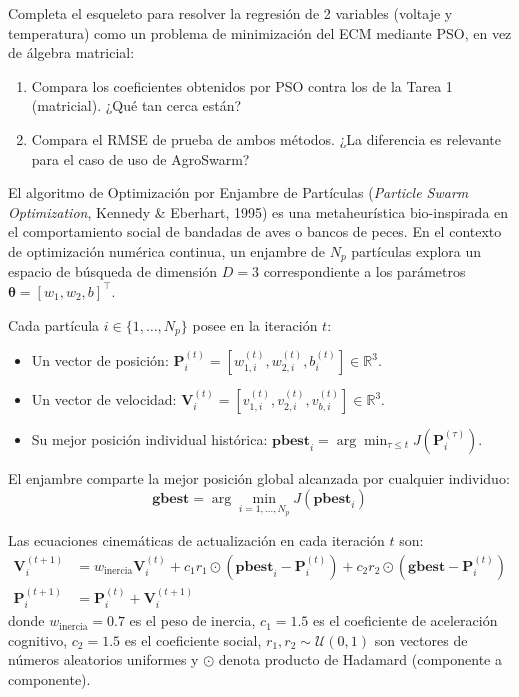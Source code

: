 \documentclass[12pt,a4paper]{article}
\newcommand{\titlefont}{\sffamily\bfseries}
\newcommand{\pthreeStep}[1]{%
  \par\vspace{10pt}%
  \noindent{\titlefont\fontsize{10.5}{12.5}\selectfont\bfseries\color{p3blue}\MakeUppercase{#1}}%
  \nopagebreak\par\vspace{3pt}\nopagebreak
}
\newcommand{\R}{\mathbb{R}}
\begin{document}
\begin{pthreeProblem}
Completa el esqueleto para resolver la regresión de 2 variables (voltaje y temperatura) como un problema de minimización del ECM mediante PSO, en vez de álgebra matricial:
\begin{enumerate}[label=(\alph*)]
  \item Compara los coeficientes obtenidos por PSO contra los de la Tarea 1 (matricial). ¿Qué tan cerca están?
  \item Compara el RMSE de prueba de ambos métodos. ¿La diferencia es relevante para el caso de uso de AgroSwarm?
\end{enumerate}
\end{pthreeProblem}

\pthreeStep{Paso 1: Fundamento Algorítmico de PSO}
El algoritmo de Optimización por Enjambre de Partículas (\textit{Particle Swarm Optimization}, Kennedy \& Eberhart, 1995) es una metaheurística bio-inspirada en el comportamiento social de bandadas de aves o bancos de peces. En el contexto de optimización numérica continua, un enjambre de $N_p$ partículas explora un espacio de búsqueda de dimensión $D = 3$ correspondiente a los parámetros $\boldsymbol{\theta} = [w_1, w_2, b]^\top$.

Cada partícula $i \in \{1, \dots, N_p\}$ posee en la iteración $t$:
\begin{itemize}[label={\color{p3blue}$\blacktriangleright$}]
  \item Un vector de posición: $\mathbf{P}_i^{(t)} = [w_{1,i}^{(t)}, w_{2,i}^{(t)}, b_i^{(t)}] \in \R^3$.
  \item Un vector de velocidad: $\mathbf{V}_i^{(t)} = [v_{1,i}^{(t)}, v_{2,i}^{(t)}, v_{b,i}^{(t)}] \in \R^3$.
  \item Su mejor posición individual histórica: $\mathbf{pbest}_i = \arg\min_{\tau \le t} J(\mathbf{P}_i^{(\tau)})$.
\end{itemize}

El enjambre comparte la mejor posición global alcanzada por cualquier individuo:
\begin{equation}
  \mathbf{gbest} = \arg\min_{i=1,\dots,N_p} J(\mathbf{pbest}_i)
\end{equation}

Las ecuaciones cinemáticas de actualización en cada iteración $t$ son:
\begin{align}
  \mathbf{V}_i^{(t+1)} &= w_{\text{inercia}} \mathbf{V}_i^{(t)} + c_1 r_1 \odot \left(\mathbf{pbest}_i - \mathbf{P}_i^{(t)}\right) + c_2 r_2 \odot \left(\mathbf{gbest} - \mathbf{P}_i^{(t)}\right) \\
  \mathbf{P}_i^{(t+1)} &= \mathbf{P}_i^{(t)} + \mathbf{V}_i^{(t+1)}
\end{align}
donde $w_{\text{inercia}} = 0.7$ es el peso de inercia, $c_1 = 1.5$ es el coeficiente de aceleración cognitivo, $c_2 = 1.5$ es el coeficiente social, $r_1, r_2 \sim \mathcal{U}(0, 1)$ son vectores de números aleatorios uniformes y $\odot$ denota producto de Hadamard (componente a componente).
\end{document}
